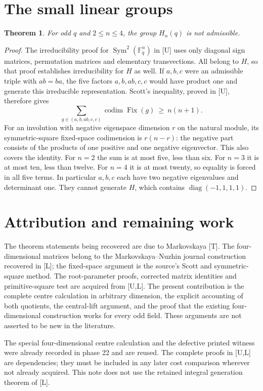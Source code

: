 \documentclass[11pt,a4paper]{article}
\newtheorem{theorem}{Theorem}
\newcommand{\diag}{\operatorname{diag}}
\newcommand{\F}{\mathbb F}
\begin{document}
\section{The small linear groups}
\begin{theorem}\label{small}
For odd $q$ and $2\leq n\leq4$, the group $H_n(q)$ is not admissible.
\end{theorem}
\begin{proof}
The irreducibility proof for $\operatorname{Sym}^2(\F_q^n)$ in [U]
uses only diagonal sign matrices, permutation matrices and elementary
transvections. All belong to $H$, so that proof establishes
irreducibility for $H$ as well. If $a,b,c$ were an admissible
triple with $ab=ba$, the five factors $a,b,ab,c,c$ would have product
one and generate this irreducible representation. Scott's inequality,
proved in [U], therefore gives
\[
 \sum_{g\in(a,b,ab,c,c)}\operatorname{codim}\operatorname{Fix}(g)
 \ \geq\ n(n+1).
\]
For an involution with negative eigenspace dimension $r$ on the
natural module, its symmetric-square fixed-space codimension is
$r(n-r)$: the negative part consists of the products of one positive
and one negative eigenvector. This also covers the identity.
For $n=2$ the sum is at most five, less than six. For $n=3$ it is
at most ten, less than twelve. For $n=4$ it is at most twenty,
so equality is forced in all five terms. In particular $a,b,c$
each have two negative eigenvalues and determinant one. They cannot
generate $H$, which contains $\diag(-1,1,1,1)$.
\end{proof}

\section{Attribution and remaining work}
The theorem statements being recovered are due to Markovskaya [T].
The four-dimensional matrices belong to the Markovskaya--Nuzhin
journal construction recovered in [L]; the fixed-space argument is
the source's Scott and symmetric-square method. The root-parameter
proofs, corrected matrix identities and primitive-square test are
acquired from [U,L]. The present contribution is the complete
centre calculation in arbitrary dimension, the explicit accounting
of both quotients, the central-lift argument, and the proof that the
existing four-dimensional construction works for every odd field.
These arguments are not asserted to be new in the literature.

The special four-dimensional centre calculation and the defective
printed witness were already recorded in phase 22 and are reused.
The complete proofs in [U,L] are dependencies; they must be included
in any later cost comparison wherever not already acquired. This
note does not use the retained integral generation theorem of [L].
\end{document}

